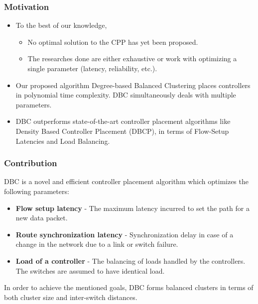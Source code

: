 \documentclass{beamer}
\begin{document}
\begin{frame}
\frametitle{Motivation}
\begin{itemize}
	\item To the best of our knowledge,
	\begin{itemize}
		\item No optimal solution to the CPP has yet been proposed.
		\item The researches done are either exhaustive or work with optimizing a single parameter (latency, reliability, etc.).
	\end{itemize}
	\item Our proposed algorithm Degree-based Balanced Clustering places controllers in polynomial time complexity. DBC simultaneously deals with multiple parameters.
	\item DBC outperforms state-of-the-art controller placement algorithms like Density Based Controller Placement (DBCP), in terms of Flow-Setup Latencies and Load Balancing.
\end{itemize}
\end{frame}

\begin{frame}
\frametitle{Contribution}
DBC is a novel and efficient controller placement algorithm which optimizes the following parameters:
\begin{itemize}
	\item \textbf{Flow setup latency} - The maximum latency incurred to set the path for a new data packet.
	\item \textbf{Route synchronization latency} - Synchronization delay in case of a change in the network due to a link or switch failure.
	\item \textbf{Load of a controller} - The balancing of loads handled by the controllers. The switches are assumed to have identical load.
\end{itemize}
In order to achieve the mentioned goals, DBC forms balanced clusters in terms of both cluster size and inter-switch distances.
\end{frame}
\end{document}
